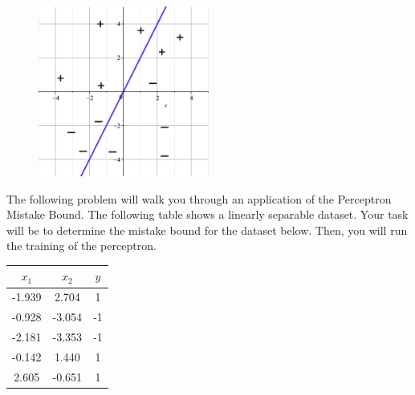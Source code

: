 \documentclass[11pt,addpoints,answers]{exam}
\begin{document}
\begin{questions}
    
    \begin{figure}[H]
        \centering
        \includegraphics[width = 0.5\textwidth]{images/perceptron_boundary.png}
        \label{Q_10perceptron}
    \end{figure}
    
    
    \clearpage
    
    
    \question[9] The following problem will walk you through an application of the Perceptron Mistake Bound. The following table shows a linearly separable dataset. Your task will be to determine the mistake bound for the dataset below. Then, you will run the training of the perceptron.
    
    \begin{center}
    \begin{tabular}{||c c c||}
        \hline
         $x_1$ & $x_2$ & $y$ \\ [0.5ex]
        \hline\hline
        -1.939 & 2.704 & 1 \\
        \hline
        -0.928 & -3.054 & -1 \\
        \hline
        -2.181 & -3.353 & -1 \\
        \hline
        -0.142 & 1.440 & 1 \\
        \hline
        2.605 & -0.651 & 1 \\
        \hline
    \end{tabular}
    \end{center}
    
\end{questions}
\end{document}
